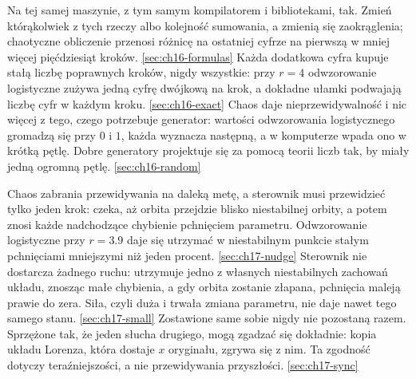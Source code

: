 %
  {Na tej samej maszynie, z tym samym kompilatorem i bibliotekami, tak. Zmień którąkolwiek z tych rzeczy albo kolejność sumowania, a zmienią się zaokrąglenia; chaotyczne obliczenie przenosi różnicę na ostatniej cyfrze na pierwszą w mniej więcej pięćdziesiąt kroków.}%
  {\ref{sec:ch16-formulas}}
%
  {Każda dodatkowa cyfra kupuje stałą liczbę poprawnych kroków, nigdy wszystkie: przy $r = 4$ odwzorowanie logistyczne zużywa jedną cyfrę dwójkową na krok, a dokładne ułamki podwajają liczbę cyfr w każdym kroku.}%
  {\ref{sec:ch16-exact}}
%
  {Chaos daje nieprzewidywalność i nic więcej z tego, czego potrzebuje generator: wartości odwzorowania logistycznego gromadzą się przy $0$ i $1$, każda wyznacza następną, a w komputerze wpada ono w krótką pętlę. Dobre generatory projektuje się za pomocą teorii liczb tak, by miały jedną ogromną pętlę.}%
  {\ref{sec:ch16-random}}

%
  {Chaos zabrania przewidywania na daleką metę, a sterownik musi przewidzieć tylko jeden krok: czeka, aż orbita przejdzie blisko niestabilnej orbity, a potem znosi każde nadchodzące chybienie pchnięciem parametru. Odwzorowanie logistyczne przy $r = \num{3.9}$ daje się utrzymać w niestabilnym punkcie stałym pchnięciami mniejszymi niż jeden procent.}%
  {\ref{sec:ch17-nudge}}
%
  {Sterownik nie dostarcza żadnego ruchu: utrzymuje jedno z własnych niestabilnych zachowań układu, znosząc małe chybienia, a gdy orbita zostanie złapana, pchnięcia maleją prawie do zera. Siła, czyli duża i trwała zmiana parametru, nie daje nawet tego samego stanu.}%
  {\ref{sec:ch17-small}}
%
  {Zostawione same sobie nigdy nie pozostaną razem. Sprzężone tak, że jeden słucha drugiego, mogą zgadzać się dokładnie: kopia układu Lorenza, która dostaje $x$ oryginału, zgrywa się z nim. Ta zgodność dotyczy teraźniejszości, a nie przewidywania przyszłości.}%
  {\ref{sec:ch17-sync}}

